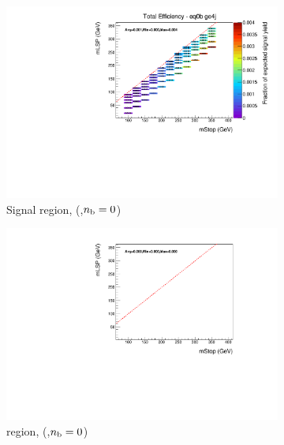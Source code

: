 \begin{figure}[p]
\begin{subfigure}[b]{0.47\textwidth}
    \includegraphics[width=\textwidth]{Figs/sms/t2cc/v37/effs/T2cc_had_eff_maps_eq0b_ge4j_SITV.pdf}
    \caption{Signal region, (\njhigh,$n_{\text{b}}=0$)}
    \label{fig:t2cc_sig_eff_ge4j_0b}
  \end{subfigure}
  \begin{subfigure}[b]{0.47\textwidth}
    \includegraphics[width=\textwidth]{Figs/sms/t2cc/v37/effs/T2cc_muon_eff_maps_eq0b_ge4j_SITV.pdf}
    \caption{\mj region, (\njhigh,$n_{\text{b}}=0$)}
    \label{fig:t2cc_mu_eff_ge4j_0b}
  \end{subfigure} \\
  \begin{subfigure}[b]{0.47\textwidth}

\end{subfigure}
\end{figure}
